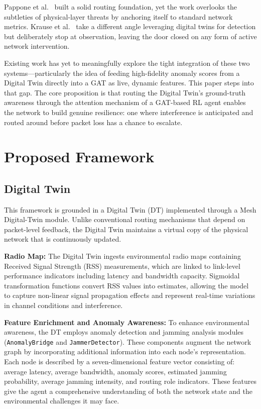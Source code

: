 \documentclass[conference]{IEEEtran}
\begin{document}
Pappone et al.~\cite{pappone2023} built a solid routing foundation, yet the work overlooks the subtleties of physical-layer threats by anchoring itself to standard network metrics. Krause et al.~\cite{krause2023} take a different angle leveraging digital twins for detection but deliberately stop at observation, leaving the door closed on any form of active network intervention.

Existing work has yet to meaningfully explore the tight integration of these two systems—particularly the idea of feeding high-fidelity anomaly scores from a Digital Twin directly into a GAT as live, dynamic features. This paper steps into that gap. The core proposition is that routing the Digital Twin's ground-truth awareness through the attention mechanism of a GAT-based RL agent enables the network to build genuine resilience: one where interference is anticipated and routed around before packet loss has a chance to escalate.

\section{Proposed Framework}

\subsection{Digital Twin}

This framework is grounded in a Digital Twin (DT) implemented through a Mesh Digital-Twin module. Unlike conventional routing mechanisms that depend on packet-level feedback, the Digital Twin maintains a virtual copy of the physical network that is continuously updated.

\textbf{Radio Map:}
The Digital Twin ingests environmental radio maps containing Received Signal Strength (RSS) measurements, which are linked to link-level performance indicators including latency and bandwidth capacity. Sigmoidal transformation functions convert RSS values into estimates, allowing the model to capture non-linear signal propagation effects and represent real-time variations in channel conditions and interference.

\textbf{Feature Enrichment and Anomaly Awareness:}
To enhance environmental awareness, the DT employs anomaly detection and jamming analysis modules (\texttt{AnomalyBridge} and \texttt{JammerDetector}). These components augment the network graph by incorporating additional information into each node's representation. Each node is described by a seven-dimensional feature vector consisting of: average latency, average bandwidth, anomaly scores, estimated jamming probability, average jamming intensity, and routing role indicators. These features give the agent a comprehensive understanding of both the network state and the environmental challenges it may face.
\end{document}
